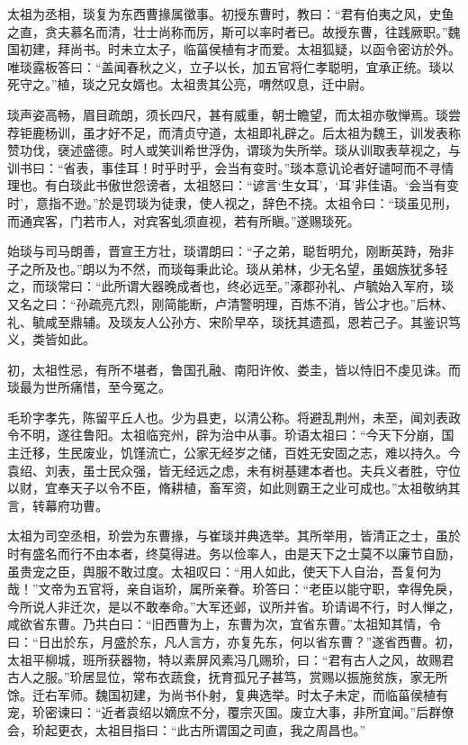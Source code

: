 \documentclass[12pt,UTF8]{ctexbook}
\begin{document}
太祖为丞相，琰复为东西曹掾属徵事。初授东曹时，教曰：“君有伯夷之风，史鱼之直，贪夫慕名而清，壮士尚称而厉，斯可以率时者已。故授东曹，往践厥职。”魏国初建，拜尚书。时未立太子，临菑侯植有才而爱。太祖狐疑，以函令密访於外。唯琰露板答曰：“盖闻春秋之义，立子以长，加五官将仁孝聪明，宜承正统。琰以死守之。”植，琰之兄女婿也。太祖贵其公亮，喟然叹息，迁中尉。

琰声姿高畅，眉目疏朗，须长四尺，甚有威重，朝士瞻望，而太祖亦敬惮焉。琰尝荐钜鹿杨训，虽才好不足，而清贞守道，太祖即礼辟之。后太祖为魏王，训发表称赞功伐，襃述盛德。时人或笑训希世浮伪，谓琰为失所举。琰从训取表草视之，与训书曰：“省表，事佳耳！时乎时乎，会当有变时。”琰本意讥论者好谴呵而不寻情理也。有白琰此书傲世怨谤者，太祖怒曰：“谚言‘生女耳’，‘耳’非佳语。‘会当有变时’，意指不逊。”於是罚琰为徒隶，使人视之，辞色不挠。太祖令曰：“琰虽见刑，而通宾客，门若市人，对宾客虬须直视，若有所瞋。”遂赐琰死。

始琰与司马朗善，晋宣王方壮，琰谓朗曰：“子之弟，聪哲明允，刚断英跱，殆非子之所及也。”朗以为不然，而琰每秉此论。琰从弟林，少无名望，虽姻族犹多轻之，而琰常曰：“此所谓大器晚成者也，终必远至。”涿郡孙礼、卢毓始入军府，琰又名之曰：“孙疏亮亢烈，刚简能断，卢清警明理，百炼不消，皆公才也。”后林、礼、毓咸至鼎辅。及琰友人公孙方、宋阶早卒，琰抚其遗孤，恩若己子。其鉴识笃义，类皆如此。

初，太祖性忌，有所不堪者，鲁国孔融、南阳许攸、娄圭，皆以恃旧不虔见诛。而琰最为世所痛惜，至今冤之。

毛玠字孝先，陈留平丘人也。少为县吏，以清公称。将避乱荆州，未至，闻刘表政令不明，遂往鲁阳。太祖临兖州，辟为治中从事。玠语太祖曰：“今天下分崩，国主迁移，生民废业，饥馑流亡，公家无经岁之储，百姓无安固之志，难以持久。今袁绍、刘表，虽士民众强，皆无经远之虑，未有树基建本者也。夫兵义者胜，守位以财，宜奉天子以令不臣，脩耕植，畜军资，如此则霸王之业可成也。”太祖敬纳其言，转幕府功曹。

太祖为司空丞相，玠尝为东曹掾，与崔琰并典选举。其所举用，皆清正之士，虽於时有盛名而行不由本者，终莫得进。务以俭率人，由是天下之士莫不以廉节自励，虽贵宠之臣，舆服不敢过度。太祖叹曰：“用人如此，使天下人自治，吾复何为哉！”文帝为五官将，亲自诣玠，属所亲眷。玠答曰：“老臣以能守职，幸得免戾，今所说人非迁次，是以不敢奉命。”大军还邺，议所并省。玠请谒不行，时人惮之，咸欲省东曹。乃共白曰：“旧西曹为上，东曹为次，宜省东曹。”太祖知其情，令曰：“日出於东，月盛於东，凡人言方，亦复先东，何以省东曹？”遂省西曹。初，太祖平柳城，班所获器物，特以素屏风素冯几赐玠，曰：“君有古人之风，故赐君古人之服。”玠居显位，常布衣蔬食，抚育孤兄子甚笃，赏赐以振施贫族，家无所馀。迁右军师。魏国初建，为尚书仆射，复典选举。时太子未定，而临菑侯植有宠，玠密谏曰：“近者袁绍以嫡庶不分，覆宗灭国。废立大事，非所宜闻。”后群僚会，玠起更衣，太祖目指曰：“此古所谓国之司直，我之周昌也。”
\end{document}
